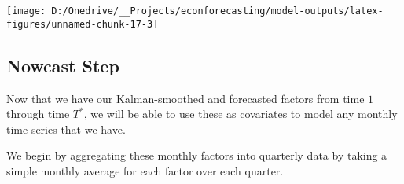 \documentclass[11pt, letterpaper]{article}\usepackage[]{graphicx}\usepackage[]{color}
\begin{document}
{\centering \texttt{[image: D:/Onedrive/\_\_Projects/econforecasting/model-outputs/latex-figures/unnamed-chunk-17-3]} 

}





\subsection{Nowcast Step}
Now that we have our Kalman-smoothed and forecasted factors from time $1$ through time $T^*$, we will be able to use these as covariates to model any monthly time series that we have.

We begin by aggregating these monthly factors into quarterly data by taking a simple monthly average for each factor over each quarter.
\end{document}

